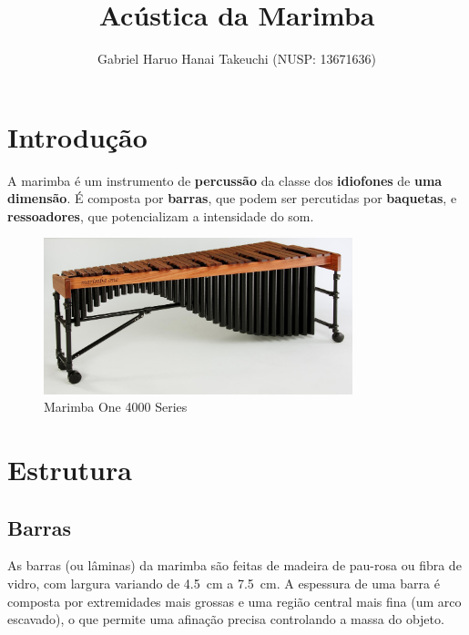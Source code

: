 \documentclass{article}
\title{Acústica da Marimba}
\author{Gabriel Haruo Hanai Takeuchi (NUSP: 13671636)}
\date{}
\begin{document}
\maketitle

\section{Introdução}

A marimba é um instrumento de \textbf{percussão} da classe dos \textbf{idiofones} de \textbf{uma dimensão}. É composta por \textbf{barras}, que podem ser percutidas por \textbf{baquetas}, e \textbf{ressoadores}, que potencializam a intensidade do som.

\begin{figure}[h!]
  \centering
  \includegraphics[width=0.8\textwidth]{Marimba_One_4000_Series.jpg}
  \caption{Marimba One 4000 Series~\cite{wiki:marimba}}
  \noindent 
\end{figure}

\section{Estrutura}

\subsection{Barras}

As barras (ou lâminas) da marimba são feitas de madeira de pau-rosa ou fibra de vidro, com largura variando de \SI{4.5}{\centi\meter} a \SI{7.5}{\centi\meter}. A espessura de uma barra é composta por extremidades mais grossas e uma região central mais fina (um arco escavado), o que permite uma afinação precisa controlando a massa do objeto.
\end{document}
